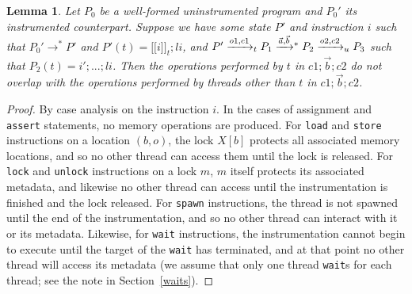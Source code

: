 \documentclass[preprint, 10pt]{sigplanconf}
\newcommand{\meanl}{\ensuremath{[ \! [}}
\newcommand{\meanr}{\ensuremath{] \! ]}}
\newcommand{\means}[1]{\ensuremath{\meanl #1 \meanr}}
\newcommand{\instr}[2]{\ensuremath{\means{#2}_{#1}}}
\newcommand{\tto}[1]{\mathrel{
  \vphantom{\xrightarrow{#1}}
  \smash{\xrightarrow{#1}}
  \vphantom{\to}^{*}}
}
\newtheorem{lemma}{Lemma}
\begin{document}
\begin{lemma}\label{indep}Let $P_0$ be a well-formed uninstrumented program and $P_0'$ its instrumented counterpart. Suppose we have some state $P'$ and instruction $i$ such that $P_0' \rightarrow^{*} P'$ and $P'(t) = \instr{t}{i}; \mathit{li}$, and $P' \xrightarrow{o1, c1}_t P_1 \tto{\vec{a}, \vec{b}} P_2 \xrightarrow{o2, c2}_u P_3$ such that $P_2(t) = i'; ...; \mathit{li}$. Then the operations performed by $t$ in $c1; \vec{b}; c2$ do not overlap with the operations performed by threads other than $t$ in $c1; \vec{b}; c2$.\end{lemma}
\begin{proof}By case analysis on the instruction $i$. In the cases of assignment and \texttt{assert} statements, no memory operations are produced. For \texttt{load} and \texttt{store} instructions on a location $(b, o)$, the lock $X[b]$ protects all associated memory locations, and so no other thread can access them until the lock is released. For \texttt{lock} and \texttt{unlock} instructions on a lock $m$, $m$ itself protects its associated metadata, and likewise no other thread can access until the instrumentation is finished and the lock released. For \texttt{spawn} instructions, the thread is not spawned until the end of the instrumentation, and so no other thread can interact with it or its metadata. Likewise, for \texttt{wait} instructions, the instrumentation cannot begin to execute until the target of the \texttt{wait} has terminated, and at that point no other thread will access its metadata (we assume that only one thread \texttt{wait}s for each thread; see the note in Section~\ref{waits}).\end{proof}
\end{document}
